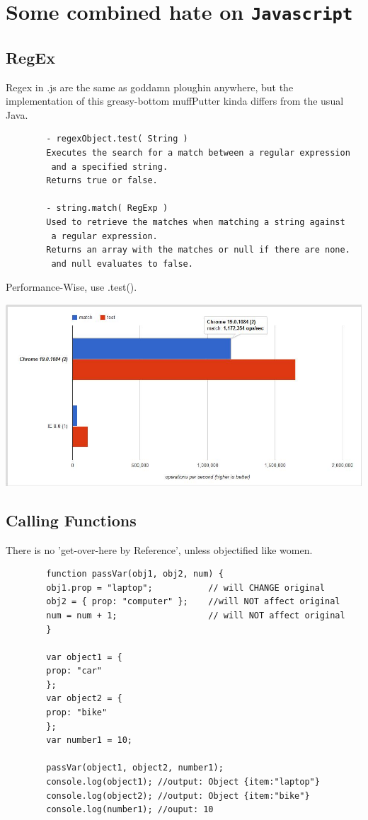 \documentclass[11pt]{article}
\begin{document}
    \section{Some combined hate on \texttt{Javascript}}

    \subsection{RegEx}
    Regex in .js are the same as goddamn ploughin anywhere, but the implementation of
    this greasy-bottom muffPutter kinda differs from the usual Java.

    \begin{verbatim}
        - regexObject.test( String )
        Executes the search for a match between a regular expression
         and a specified string.
        Returns true or false.

        - string.match( RegExp )
        Used to retrieve the matches when matching a string against
         a regular expression.
        Returns an array with the matches or null if there are none.
         and null evaluates to false.
    \end{verbatim}

    Performance-Wise, use .test().\\
    \begin{center}
        \includegraphics[width=\textwidth]{jsRegex.jpg}
    \end{center}

    \subsection{Calling Functions}
    There is no 'get-over-here by Reference', unless objectified like women.
    \begin{verbatim}
        function passVar(obj1, obj2, num) {
        obj1.prop = "laptop";           // will CHANGE original
        obj2 = { prop: "computer" };    //will NOT affect original
        num = num + 1;                  // will NOT affect original
        }

        var object1 = {
        prop: "car"
        };
        var object2 = {
        prop: "bike"
        };
        var number1 = 10;

        passVar(object1, object2, number1);
        console.log(object1); //output: Object {item:"laptop"}
        console.log(object2); //output: Object {item:"bike"}
        console.log(number1); //ouput: 10
    \end{verbatim}
\end{document}
